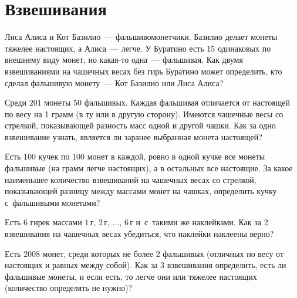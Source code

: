 

\section*{Взвешивания}


\begin{problems}

\item
Лиса Алиса и Кот Базилио~--- фальшивомонетчики.
Базилио делает монеты тяжелее настоящих, а Алиса~--- легче.
У Буратино есть 15 одинаковых по внешнему виду монет, но какая-то одна~---
фальшивая.
Как двумя взвешиваниями на чашечных весах без гирь Буратино может определить,
кто сделал фальшивую монету~--- Кот Базилио или Лиса Алиса?

\item
Среди $201$ монеты $50$ фальшивых.
Каждая фальшивая отличается от настоящей по весу на 1 грамм
(в ту или в другую сторону).
Имеются чашечные весы со стрелкой, показывающей разность масс одной и другой
чашки.
Как за одно взвешивание узнать, является ли заранее выбранная монета настоящей?

\item
Есть $100$ кучек по $100$ монет в каждой, ровно в одной кучке все монеты
фальшивые (на грамм легче настоящих), а в остальных все настоящие.
За какое наименьшее количество взвешиваний на чашечных весах со стрелкой,
показывающей разницу между массами монет на чашках, определить кучку
с~фальшивыми монетами?


\item
Есть 6 гирек массами
$1\,\text{г}$, $2\,\text{г}$, $\ldots$, $6\,\text{г}$
и~с~такими же наклейками.
Как за 2 взвешивания на чашечных весах убедиться, что наклейки наклеены верно?

\item
Есть $2008$ монет, среди которых не более $2$ фальшивых
(отличных по весу от настоящих и равных между собой).
Как за $3$ взвешивания определить, есть ли фальшивые монеты, и если есть, то
легче они или тяжелее настоящих (количество определять не нужно)?


\end{problems}
